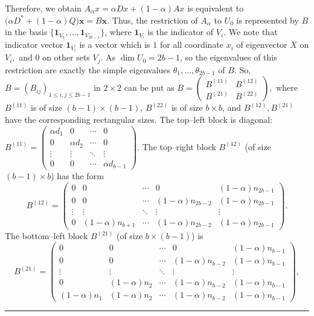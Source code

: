 \documentclass[12pt,twoside]{article}
\renewenvironment{proof}{{\noindent\bfseries Proof.}}{\qed}
\def\qed{\nolinebreak\hfill\rule{.2cm}{.2cm}\par\addvspace{.5cm}}
\begin{document}
\begin{proof}
	Therefore, we obtain $A_\alpha x
	= \alpha D x + (1-\alpha) A x$ is equivalent to $\bigl(\alpha D^\ast + (1-\alpha)Q\bigr)\mathbf{x}= B \mathbf{x}.$
	Thus, the restriction of $A_\alpha$ to $U_0$ is represented by $B$
	in the basis $\{\mathbf{1}_{V_1},\dots,\mathbf{1}_{V_{2b-1}}\}$,
	where $\mathbf{1}_{V_i}$ is the indicator of $V_i$. We note that indicator vector $\mathbf{1}_{V_i}$ is a vector which is $1$ for all coordinate $x_{i}$ of eigenvector $X$ on $V_{i},$ and $0$ on other sets $V_{j}$.
	As $\dim U_0 = 2b-1$, so the eigenvalues of this restriction are exactly the simple eigenvalues $\theta_1,\dots,\theta_{2b-1}$ of $B$. So, $B=(B_{ij})_{1\le i,j\le 2b-1}$ in $2\times 2$ can be put as $B =
	\begin{pmatrix}
		B^{(11)} & B^{(12)}\\[4pt]
		B^{(21)} & B^{(22)}
	\end{pmatrix},$	where $B^{(11)}$ is of size $(b-1)\times(b-1)$, $B^{(22)}$ is of size $b\times b$, and
	$B^{(12)},B^{(21)}$ have the corresponding rectangular sizes. The top--left block is diagonal:
	$B^{(11)} =
	\begin{pmatrix}
		\alpha d_1   & 0           & \cdots & 0\\
		0            & \alpha d_2  & \cdots & 0\\
		\vdots       & \vdots      & \ddots & \vdots\\
		0            & 0           & \cdots & \alpha d_{b-1}
	\end{pmatrix}.$	
	The top--right block $B^{(12)}$ (of size $(b-1)\times b$) has the form
	\[
	B^{(12)} =
	\begin{pmatrix}
		0              & 0              & \cdots & 0                  & (1-\alpha)n_{2b-1}\\[2pt]
		0              & 0              & \cdots & (1-\alpha)n_{2b-2} & (1-\alpha)n_{2b-1}\\[2pt]
		\vdots         & \vdots         & \ddots & \vdots             & \vdots\\[2pt]
		0              & (1-\alpha)n_{b+1} & \cdots & (1-\alpha)n_{2b-2} & (1-\alpha)n_{2b-1}
	\end{pmatrix}.
	\]
	The bottom--left block $B^{(21)}$ (of size $b\times(b-1)$) is
	\[
	B^{(21)} =
	\begin{pmatrix}
		0              & 0              & \cdots & 0               & (1-\alpha)n_{b-1}\\[2pt]
		0              & 0              & \cdots & (1-\alpha)n_{b-2} & (1-\alpha)n_{b-1}\\[2pt]
		\vdots         & \vdots         & \ddots & \vdots          & \vdots\\[2pt]
		0              & (1-\alpha)n_{2} & \cdots & (1-\alpha)n_{b-2} & (1-\alpha)n_{b-1}\\[2pt]
		(1-\alpha)n_{1} & (1-\alpha)n_{2} & \cdots & (1-\alpha)n_{b-2} & (1-\alpha)n_{b-1}
	\end{pmatrix},
	\]
	

\end{proof}
\end{document}
